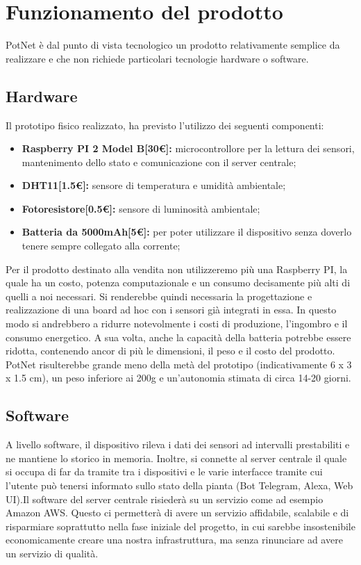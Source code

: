 \newpage
\section{Funzionamento del prodotto}

PotNet è dal punto di vista tecnologico un prodotto relativamente semplice da realizzare e che non richiede particolari tecnologie hardware o software. 

\subsection{Hardware}

Il prototipo fisico realizzato, ha previsto l'utilizzo dei seguenti componenti:

\begin{itemize}
	\item \textbf{Raspberry PI 2 Model B[30€]:} microcontrollore per la lettura dei sensori, mantenimento dello stato e comunicazione con il server centrale;
	\item \textbf{DHT11[1.5€]:} sensore di temperatura e umidità ambientale;
	\item \textbf{Fotoresistore[0.5€]:} sensore di luminosità ambientale;
	\item \textbf{Batteria da 5000mAh[5€]:} per poter utilizzare il dispositivo senza doverlo tenere sempre collegato alla corrente;
\end{itemize}

Per il prodotto destinato alla vendita non utilizzeremo più una Raspberry PI, la quale ha un costo, potenza computazionale e un consumo decisamente più alti di quelli a noi necessari. Si renderebbe quindi necessaria la progettazione e realizzazione di una board ad hoc con i sensori già integrati in essa. In questo modo si andrebbero a ridurre notevolmente i costi di produzione, l'ingombro e il consumo energetico. A sua volta, anche la capacità della batteria potrebbe essere ridotta, contenendo ancor di più le dimensioni, il peso e il costo del prodotto. PotNet risulterebbe grande meno della metà del prototipo (indicativamente 6 x 3 x 1.5 cm), un peso inferiore ai 200g e un'autonomia stimata di circa 14-20 giorni.

\subsection{Software}

A livello software, il dispositivo rileva i dati dei sensori ad intervalli prestabiliti e ne mantiene lo storico in memoria. Inoltre, si connette al server centrale il quale si occupa di far da tramite tra i dispositivi e le varie interfacce tramite cui l'utente può tenersi informato sullo stato della pianta (Bot Telegram, Alexa, Web UI).\newline\newline Il software del server centrale risiederà su un servizio come ad esempio Amazon AWS. Questo ci permetterà di avere un servizio affidabile, scalabile e di risparmiare soprattutto nella fase iniziale del progetto, in cui sarebbe insostenibile economicamente creare una nostra infrastruttura, ma senza rinunciare ad avere un servizio di qualità.

